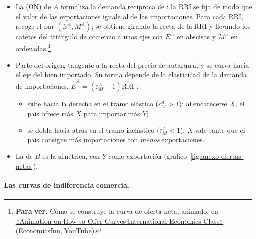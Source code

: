 \documentclass[11pt]{article}
\begin{document}
\begin{itemize}
\item La  (ON) de $A$ formaliza la demanda recíproca de : la RRI se fija de modo que el valor de las exportaciones iguale al de las importaciones\nocite{Marshall1879Pure}. Para cada RRI, recoge el par $(E^A,M^A)$; se obtiene girando la recta de la RRI y llevando los catetos del triángulo de comercio a unos ejes con $E^A$ en abscisas y $M^A$ en ordenadas.\footnote{\textbf{Para ver.} Cómo se construye la curva de oferta neta, animado, en \href{https://www.youtube.com/watch?v=avf0o-PzQEA}{«Animation on How to Offer Curves International Economics Class»} (Economicsfun, YouTube).}
\item Parte del origen, tangente a la recta del precio de autarquía, y se curva hacia el eje del bien importado. Su forma depende de la elasticidad de la demanda de importaciones, $\hat E^A=(\varepsilon^A_M-1)\widehat{\mathrm{RRI}}$ :
  \begin{itemize}
  \item sube hacia la derecha en el tramo elástico ($\varepsilon^A_M>1$): al encarecerse $X$, el país ofrece más $X$ para importar más $Y$;
  \item se dobla hacia atrás en el tramo inelástico ($\varepsilon^A_M<1$): $X$ vale tanto que el país consigue más importaciones con \emph{menos} exportaciones.
  \end{itemize}
\item La de $B$ es la simétrica, con $Y$ como exportación (gráfico~\ref{fig:anexo-ofertas-netas}).
\end{itemize}

\paragraph{Las curvas de indiferencia comercial}
\end{document}
